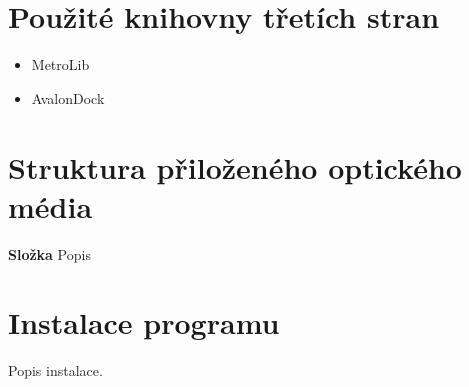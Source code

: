 \documentclass[czech,bachelor,public,dept460,male,oneside]{diploma}
\begin{document}
\appendix
\section{Použité knihovny třetích stran}
\begin{itemize}
	\item MetroLib
	\item AvalonDock
\end{itemize}

\section{Struktura přiloženého optického média}
\textbf{Složka} Popis

\section{Instalace programu}
Popis instalace.
\end{document}
